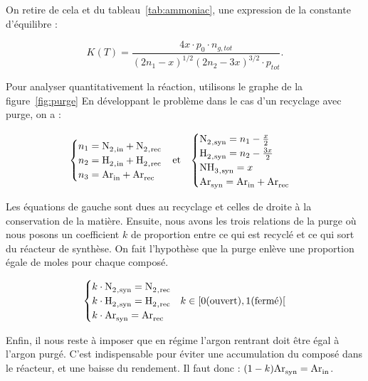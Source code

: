 On retire de cela et du tableau~\ref{tab:ammoniac}, une expression de la constante d'équilibre :

$$K(T) = \frac{4x\cdot p_0\cdot n_{g,tot}}{(2n_1 - x)^{1/2} (2n_2 - 3x)^{3/2} \cdot p_{tot}}.$$

Pour analyser quantitativement la réaction, utilisons le graphe de la figure~\ref{fig:purge}
En développant le problème dans le cas d'un recyclage avec purge, on a :

\begin{align}
	\notag
	\begin{cases}
	 n_1 = \ce{N2_{,in} + N2_{,rec}} \\
	 n_2 = \ce{H2_{,in} + H2_{,rec}} \\
	 n_3 = \ce{Ar_{in} + Ar_{rec}} \\
	\end{cases}
	 &  \text{et}  &
	\begin{cases}
	 \ce{N2_{,syn}} = n_1 - \frac{x}{2} \\
	 \ce{H2_{,syn}} = n_2 - \frac{3x}{2} \\
	 \ce{NH3_{,syn}} = x \\
	 \ce{Ar_{syn} = Ar_{in} + Ar_{rec}} \\ 
	\end{cases}
	\\
\end{align}

Les équations de gauche sont dues au recyclage et celles de droite 
à la conservation de la matière. Ensuite, nous avons les trois relations
de la purge où nous posons un coefficient $k$ de proportion entre ce qui
est recyclé et ce qui sort du réacteur de synthèse. On fait l'hypothèse
que la purge enlève une proportion égale de moles pour chaque composé.

$$
\begin{cases}
 k\cdot \ce{N2_{,syn}} = \ce{N2_{,rec}} \\ 
 k\cdot \ce{H2_{,syn}} = \ce{H2_{,rec}} & k \in [0 \text{(ouvert)}, 1 \text{(fermé)}[ \\
 k\cdot \ce{Ar_{syn}} = \ce{Ar_{rec}} \\
\end{cases}
$$

Enfin, il nous reste à imposer que en régime l'argon rentrant doit être égal
à l'argon purgé. C'est indispensable pour éviter une accumulation du composé
dans le réacteur, et une baisse du rendement. 
Il faut donc : $(1 - k)\ce{Ar_{syn}} = \ce{Ar_{in}}$.


